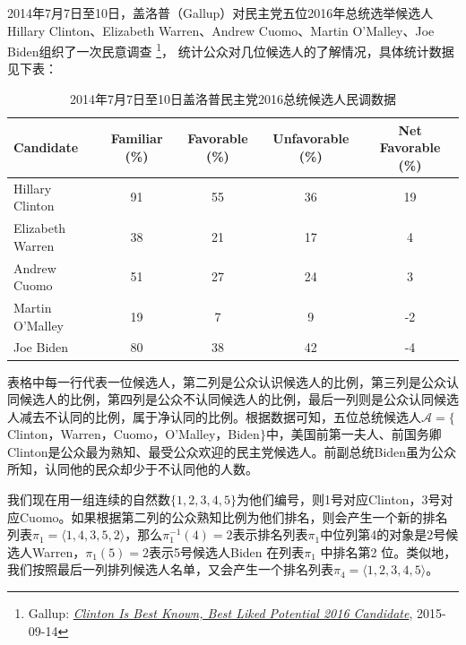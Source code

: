 \begin{example}\label{eg:gallup-2016}
    2014年7月7日至10日，盖洛普（Gallup）对民主党五位2016年总统选举候选人Hillary Clinton、Elizabeth Warren、Andrew Cuomo、Martin O'Malley、Joe Biden组织了一次民意调查
    \footnote{Gallup: \href{http://www.gallup.com/poll/173402/clinton-best-known-best-liked-potential-2016-candidate.aspx}{\textit{Clinton Is Best Known, Best Liked Potential 2016 Candidate}}, 2015-09-14}，
    统计公众对几位候选人的了解情况，具体统计数据见下表：
    \begin{table}[htbp]
        \centering
        \begin{tabular}{lcccc}
          \hline
          Candidate & Familiar (\%) & Favorable (\%) & Unfavorable (\%) & Net Favorable (\%)\\
          \hline
          Hillary Clinton & 91 & 55 & 36 & 19\\
          Elizabeth Warren & 38 & 21 & 17 & 4\\
          Andrew Cuomo & 51 & 27 & 24 & 3\\
          Martin O'Malley & 19 & 7 & 9 & -2\\
          Joe Biden & 80 & 38 & 42 & -4\\
          \hline
        \end{tabular}
        \caption{2014年7月7日至10日盖洛普民主党2016总统候选人民调数据}
        \label{tbl:gallup-2016}
    \end{table}
    表格中每一行代表一位候选人，第二列是公众认识候选人的比例，第三列是公众认同候选人的比例，第四列是公众不认同候选人的比例，最后一列则是公众认同候选人减去不认同的比例，属于净认同的比例。根据数据可知，五位总统候选人$\mathcal A=\big\{$Clinton，Warren，Cuomo，O'Malley，Biden$\big\}$中，美国前第一夫人、前国务卿Clinton是公众最为熟知、最受公众欢迎的民主党候选人。前副总统Biden虽为公众所知，认同他的民众却少于不认同他的人数。

    我们现在用一组连续的自然数$\{1,2,3,4,5\}$为他们编号，则1号对应Clinton，3号对应Cuomo。如果根据第二列的公众熟知比例为他们排名，则会产生一个新的排名列表$\pi_1=\langle 1, 4, 3, 5, 2\rangle$，那么$\pi_1^{-1}(4)=2$表示排名列表$\pi_1$中位列第4的对象是2号候选人Warren，$\pi_1(5)=2$表示5号候选人Biden 在列表$\pi_1$ 中排名第2 位。类似地，我们按照最后一列排列候选人名单，又会产生一个排名列表$\pi_4=\langle1, 2, 3, 4, 5\rangle$。
\end{example}

